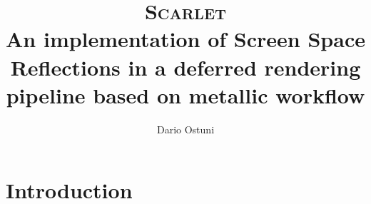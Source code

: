 \documentclass[11pt,a4paper]{report}
\begin{document}
\title{\textsc{Scarlet} \\ \large An implementation of Screen Space Reflections in a deferred rendering pipeline based on metallic workflow}
\author{Dario Ostuni}
\date{}
\maketitle

\tableofcontents

\chapter{Introduction}
\end{document}
